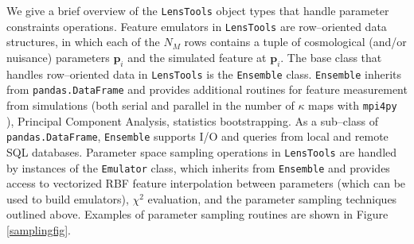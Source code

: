 \documentclass[5p]{elsarticle}
\newcommand{\bb}[1]{\mathbf{#1}}
\newcommand{\ttt}[1]{\texttt{#1}}
\newcommand{\LT}{\texttt{LensTools} }
\begin{document}
We give a brief overview of the \LT object types that handle parameter constraints operations. Feature emulators in \LT are row--oriented data structures, in which each of the $N_M$ rows contains a tuple of cosmological (and/or nuisance) parameters $\bb{p}_i$ and the simulated feature at $\bb{p}_i$. The base class that handles row--oriented data in \LT is the \ttt{Ensemble} class. \ttt{Ensemble} inherits from \ttt{pandas.DataFrame} \citep{pandas} and provides additional routines for feature measurement from simulations (both serial and parallel in the number of $\kappa$ maps with \ttt{mpi4py} \citep{mpi4py}), Principal Component Analysis, statistics bootstrapping. As a sub--class of \ttt{pandas.DataFrame}, \ttt{Ensemble} supports I/O and queries from local and remote SQL databases. Parameter space sampling operations in \LT are handled by instances of the \ttt{Emulator} class, which inherits from \ttt{Ensemble} and provides access to vectorized RBF feature interpolation between parameters (which can be used to build emulators), $\chi^2$ evaluation, and the parameter sampling techniques outlined above. Examples of parameter sampling routines are shown in Figure \ref{samplingfig}.          
\end{document}
